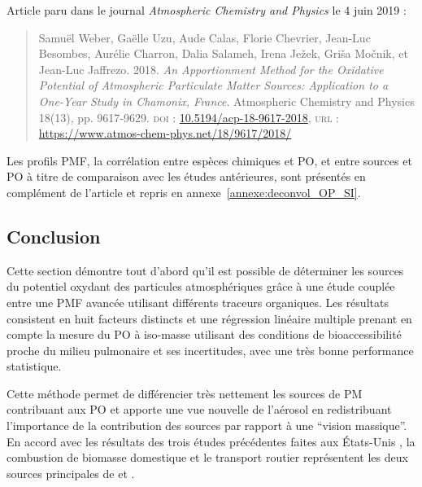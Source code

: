 \begin{tcolorbox}[colback=red!5!white,colframe=Melon,title=Note]
Article paru dans le journal \textit{Atmospheric Chemistry and Physics} le 4 juin 2019 :

\begin{quote}
    Samuël Weber, Gaëlle Uzu, Aude Calas, Florie Chevrier, Jean-Luc Besombes,
    Aurélie Charron, Dalia Salameh, Irena Ježek, Griša Močnik, et Jean-Luc Jaffrezo. 2018.
    \textit{An Apportionment Method for the Oxidative Potential of Atmospheric Particulate
    Matter Sources: Application to a One-Year Study in Chamonix, France}. Atmospheric
    Chemistry and Physics 18(13), pp. 9617‑9629.
    \textsc{doi} : \href{https://doi.org/10.5194/acp-18-9617-2018}{10.5194/acp-18-9617-2018},
    \textsc{url} : \url{https://www.atmos-chem-phys.net/18/9617/2018/}
\end{quote}

Les profils PMF, la corrélation entre espèces chimiques et PO, et entre sources et
PO à titre de comparaison avec les études antérieures, sont présentés en complément de
l'article et repris en annexe~\ref{annexe:deconvol_OP_SI}.
\end{tcolorbox}

\clearpage


\subsection{Conclusion}

Cette section démontre tout d'abord qu'il est possible de déterminer les sources du
potentiel oxydant des particules atmosphériques grâce à une étude couplée entre une PMF
avancée utilisant différents traceurs organiques. Les résultats consistent en huit facteurs
distincts et une régression linéaire multiple prenant en compte
la mesure du PO à iso-masse utilisant des conditions de bioaccessibilité proche du milieu
pulmonaire et ses incertitudes, avec une très bonne performance statistique.

Cette méthode permet de différencier très nettement les sources de PM contribuant aux PO
et apporte une vue nouvelle de l'aérosol en redistribuant l'importance de la contribution
des sources par rapport à une ``vision massique''. En accord avec les résultats des trois
études précédentes faites aux États-Unis
\autocite{vermaReactive2014,batesReactive2015,fangOxidative2016}, la combustion de
biomasse domestique et le transport routier représentent les deux sources principales de
\POAAv{} et \PODTTv.

